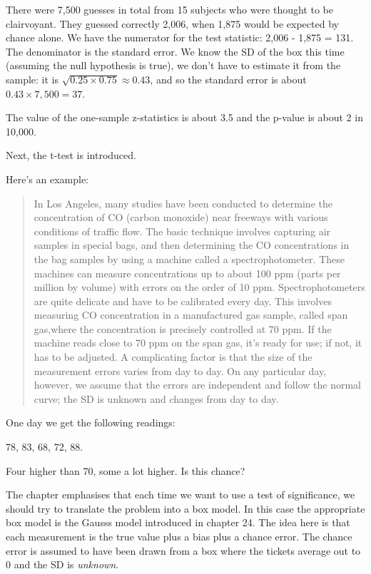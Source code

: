 \documentclass[
]{book}
\begin{document}
There were 7,500 guesses in total from 15 subjects who were thought to be clairvoyant. They guessed correctly 2,006, when 1,875 would be expected by chance alone. We have the numerator for the test statistic: 2,006 - 1,875 = 131. The denominator is the standard error. We know the SD of the box this time (assuming the null hypothesis is true), we don't have to estimate it from the sample: it is \(\sqrt{0.25 \times 0.75}\approx 0.43\), and so the standard error is about \(0.43 \times 7,500 = 37\).

The value of the one-sample z-statistics is about 3.5 and the p-value is about 2 in 10,000.

Next, the t-test is introduced.

Here's an example:

\begin{quote}
In Los Angeles, many studies have been conducted to determine the concentration of CO (carbon monoxide) near freeways with various conditions of traffic flow. The basic technique involves capturing air samples in special bags, and then determining the CO concentrations in the bag samples by using a machine called a spectrophotometer. These machines can measure concentrations up to about 100 ppm (parts per million by volume) with errors on the order of 10 ppm. Spectrophotometers are quite delicate and have to be calibrated every day. This involves measuring CO concentration in a manufactured gas sample, called span gas,where the concentration is precisely controlled at 70 ppm. If the machine reads close to 70 ppm on the span gas, it's ready for use; if not, it has to be adjusted. A complicating factor is that the size of the measurement errors varies from day to day. On any particular day, however, we assume that the errors are independent and follow the normal curve; the SD is unknown and changes from day to day.
\end{quote}

One day we get the following readings:

78, 83, 68, 72, 88.

Four higher than 70, some a lot higher. Is this chance?

The chapter emphasises that each time we want to use a test of significance, we should try to translate the problem into a box model. In this case the appropriate box model is the Gausss model introduced in chapter 24. The idea here is that each measurement is the true value plus a bias plus a chance error. The chance error is assumed to have been drawn from a box where the tickets average out to 0 and the SD is \emph{unknown}.
\end{document}
